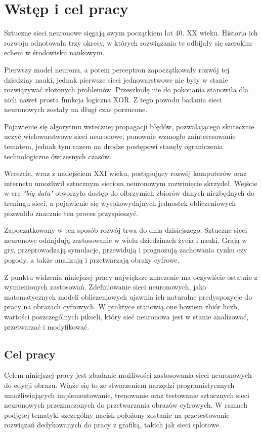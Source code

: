 \section{Wstęp i cel pracy}

  Sztuczne sieci neuronowe sięgają swym początkiem lat 40. XX wieku.
  Historia ich rozwoju odnotowała trzy okresy, w których rozwiązania te
  odbijały się szerokim echem w środowisku naukowym.

  Pierwszy model neuronu, a potem perceptron zapoczątkowały
  rozwój tej dziedziny nauki, jednak pierwsze sieci jednowarstwowe nie były w
  stanie rozwiązywać złożonych problemów. Przeszkodę nie do pokonania stanowiła
  dla nich nawet prosta funkcja logiczna XOR. Z tego powodu badania sieci
  neuronowych zostały na długi czas porzucone.

  Pojawienie się algorytmu wstecznej propagacji błędów,
  pozwalającego skutecznie uczyć wielowarstwowe sieci neuronowe, ponownie
  wzmogło zainteresowanie tematem, jednak tym razem na drodze postępowi stanęły
  ograniczenia technologiczne ówczesnych czasów.

  Wreszcie, wraz z nadejściem XXI wieku, postępujący rozwój
  komputerów oraz internetu umożliwił sztucznym sieciom neuronowym rozwinięcie
  skrzydeł. Wejście w erę \textit{"big data"} otworzyło dostęp do olbrzymich zbiorów
  danych niezbędnych do treningu sieci, a pojawienie się wysokowydajnych
  jednostek obliczeniowych pozwoliło znacznie ten proces przyspieszyć.

  Zapoczątkowany w ten sposób rozwój trwa do dnia dzisiejszego.
  Sztuczne sieci neuronowe odnajdują zastosowanie w wielu dziedzinach życia i
  nauki. Grają w gry, przeprowadzają symulacje, przewidują i prognozują
  zachowania rynku czy pogody, a także analizują i przetwarzają obrazy cyfrowe.

  Z punktu widzenia niniejszej pracy największe znaczenie ma
  oczywiście ostatnie z wymienionych zastosowań. Zdefiniowanie sieci neuronowych,
  jako matematycznych modeli obliczeniowych ujawnia ich naturalne predyspozycje
  do pracy na obrazach cyfrowych. W praktyce stanowią one bowiem zbiór liczb,
  wartości poszczególnych pikseli, który sieć neuronowa jest w stanie
  analizować, przetwarzać i modyfikować.

  \subsection{Cel pracy}

    Celem niniejszej pracy jest zbadanie możliwości zastosowania sieci neuronowych
    do edycji obrazu. Wiąże się to ze stworzeniem narzędzi programistycznych
    umożliwiających implementowanie, trenowanie oraz testowanie sztucznych sieci
    neuronowych przeznaczonych do przetwarzania
    obrazów cyfrowych. W ramach podjętej tematyki szczególny nacisk położony
    zostanie na przetestowanie rozwiązań dedykowanych do pracy z grafiką, takich jak
    sieci splotowe.

